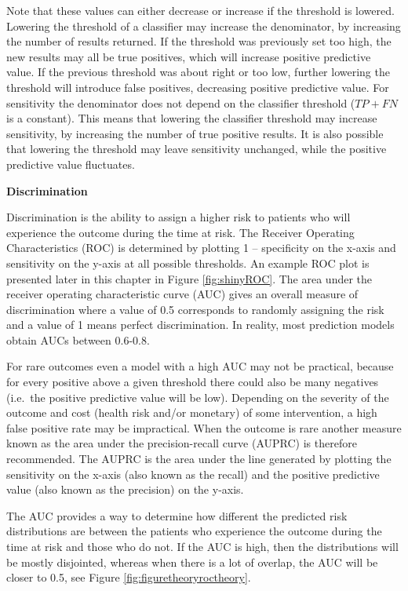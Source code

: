 \documentclass[11pt]{book}
\theoremstyle{definition}
\theoremstyle{definition}
\theoremstyle{definition}
\theoremstyle{remark}
\begin{document}
Note that these values can either decrease or increase if the threshold is lowered. Lowering the threshold of a classifier may increase the denominator, by increasing the number of results returned. If the threshold was previously set too high, the new results may all be true positives, which will increase positive predictive value. If the previous threshold was about right or too low, further lowering the threshold will introduce false positives, decreasing positive predictive value. For sensitivity the denominator does not depend on the classifier threshold (\(TP+FN\) is a constant). This means that lowering the classifier threshold may increase sensitivity, by increasing the number of true positive results. It is also possible that lowering the threshold may leave sensitivity unchanged, while the positive predictive value fluctuates.

\textbf{Discrimination}

Discrimination is the ability to assign a higher risk to patients who will experience the outcome during the time at risk. The Receiver Operating Characteristics (ROC) is determined by plotting 1 -- specificity on the x-axis and sensitivity on the y-axis at all possible thresholds. An example ROC plot is presented later in this chapter in Figure \ref{fig:shinyROC}. The area under the receiver operating characteristic curve (AUC) gives an overall measure of discrimination where a value of 0.5 corresponds to randomly assigning the risk and a value of 1 means perfect discrimination. In reality, most prediction models obtain AUCs between 0.6-0.8.

For rare outcomes even a model with a high AUC may not be practical, because for every positive above a given threshold there could also be many negatives (i.e.~the positive predictive value will be low). Depending on the severity of the outcome and cost (health risk and/or monetary) of some intervention, a high false positive rate may be impractical. When the outcome is rare another measure known as the area under the precision-recall curve (AUPRC) is therefore recommended. The AUPRC is the area under the line generated by plotting the sensitivity on the x-axis (also known as the recall) and the positive predictive value (also known as the precision) on the y-axis.

The AUC provides a way to determine how different the predicted risk distributions are between the patients who experience the outcome during the time at risk and those who do not. If the AUC is high, then the distributions will be mostly disjointed, whereas when there is a lot of overlap, the AUC will be closer to 0.5, see Figure \ref{fig:figuretheoryroctheory}.
\end{document}
